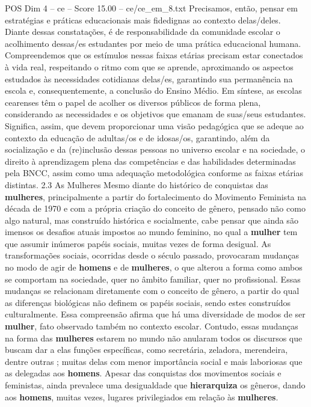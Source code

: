\begin{textsample}{POS Dim 4 – ce – Score 15.00 – ce/ce\_em\_8.txt}
Precisamos, então, pensar em estratégias e práticas educacionais mais fidedignas ao contexto delas/deles.
Diante dessas constatações, é de responsabilidade da comunidade escolar o acolhimento dessas/es estudantes por meio de uma prática educacional humana.
Compreendemos que os estímulos nessas faixas etárias precisam estar conectados à vida real, respeitando o ritmo com que se aprende, aproximando os aspectos estudados às necessidades cotidianas delas/es, garantindo sua permanência na escola e, consequentemente, a conclusão do Ensino Médio.
Em síntese, as escolas cearenses têm o papel de acolher os diversos públicos de forma plena, considerando as necessidades e os objetivos que emanam de suas/seus estudantes.
Significa, assim, que devem proporcionar uma visão pedagógica que se adeque ao contexto da educação de adultas/os e de idosas/os, garantindo, além da socialização e da (re)inclusão dessas pessoas no universo escolar e na sociedade, o direito à aprendizagem plena das competências e das habilidades determinadas pela BNCC, assim como uma adequação metodológica conforme as faixas etárias distintas. 2.3 As Mulheres Mesmo diante do histórico de conquistas das \textbf{mulheres}, principalmente a partir do fortalecimento do Movimento Feminista na década de 1970 e com a própria criação do conceito de gênero, pensado não como algo natural, mas construído histórica e socialmente, cabe pensar que ainda são imensos os desafios atuais impostos ao mundo feminino, no qual a \textbf{mulher} tem que assumir inúmeros papéis sociais, muitas vezes de forma desigual.
As transformações sociais, ocorridas desde o século passado, provocaram mudanças no modo de agir de \textbf{homens} e de \textbf{mulheres}, o que alterou a forma como ambos se comportam na sociedade, quer no âmbito familiar, quer no profissional.
Essas mudanças se relacionam diretamente com o conceito de gênero, a partir do qual as diferenças biológicas não definem os papéis sociais, sendo estes construídos culturalmente.
Essa compreensão afirma que há uma diversidade de modos de ser \textbf{mulher}, fato observado também no contexto escolar.
Contudo, essas mudanças na forma das \textbf{mulheres} estarem no mundo não anularam todos os discursos que buscam dar a elas funções específicas, como secretária, zeladora, merendeira, dentre outras ; muitas delas com menor importância social e mais laboriosas que as delegadas aos \textbf{homens}.
Apesar das conquistas dos movimentos sociais e feministas, ainda prevalece uma desigualdade que \textbf{hierarquiza} os gêneros, dando aos \textbf{homens}, muitas vezes, lugares privilegiados em relação às \textbf{mulheres}.

\end{textsample}
